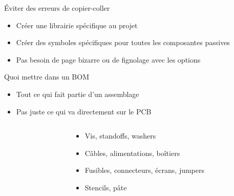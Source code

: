 \begin{frame}{Éviter des erreurs de copier-coller}
    \begin{itemize}
        \item Créer une librairie spécifique au projet
        \item Créer des symboles spécifiques pour toutes les composantes passives
        \item Pas besoin de page bizarre ou de fignolage avec les options
    \end{itemize}
\end{frame}

\begin{frame}{Quoi mettre dans un BOM}
    \begin{twocolumns}
        \leftcol
        \begin{itemize}
            \item Tout ce qui fait partie d'un assemblage
            \item Pas juste ce qui va directement sur le PCB
        \end{itemize}

        \footnotesize
        \begin{columns}
            \begin{column}{0.05\textwidth}
            \end{column}
            \begin{column}{0.95\textwidth}
                \begin{itemize}
                    \item Vis, standoffs, washers
                    \item Câbles, alimentations, boîtiers
                    \item Fusibles, connecteurs, écrans, jumpers
                    \item Stencils, pâte
                \end{itemize}
            \end{column}
        \end{columns}
        \rightcol
    \end{twocolumns}
    
    \begin{columns}
        \begin{column}{0.33\textwidth}
        \end{column}
        \begin{column}{0.33\textwidth}
        \end{column}
        \begin{column}{0.33\textwidth}
        \end{column}
    \end{columns}
\end{frame}

